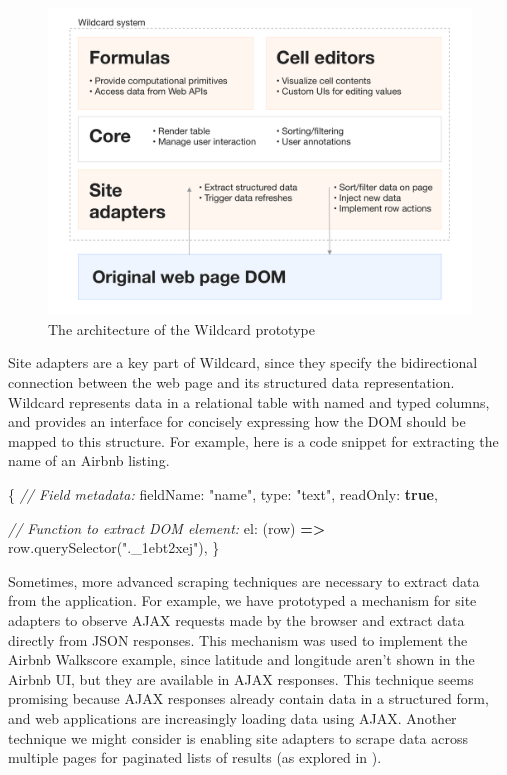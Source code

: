 \documentclass[english,submission]{programming}
\newenvironment{Shaded}{}{}
\newcommand{\CommentTok}[1]{\textcolor[rgb]{0.38,0.63,0.69}{\textit{#1}}}
\newcommand{\FunctionTok}[1]{\textcolor[rgb]{0.02,0.16,0.49}{#1}}
\newcommand{\KeywordTok}[1]{\textcolor[rgb]{0.00,0.44,0.13}{\textbf{#1}}}
\newcommand{\NormalTok}[1]{#1}
\newcommand{\OperatorTok}[1]{\textcolor[rgb]{0.40,0.40,0.40}{#1}}
\newcommand{\StringTok}[1]{\textcolor[rgb]{0.25,0.44,0.63}{#1}}
\newcommand{\VariableTok}[1]{\textcolor[rgb]{0.10,0.09,0.49}{#1}}
\begin{document}
\begin{figure}
\hypertarget{fig:architecture}{%
\centering
\includegraphics{media/architecture-300dpi.png}
\caption{The architecture of the Wildcard
prototype}\label{fig:architecture}
}
\end{figure}

Site adapters are a key part of Wildcard, since they specify the
bidirectional connection between the web page and its structured data
representation. Wildcard represents data in a relational table with
named and typed columns, and provides an interface for concisely
expressing how the DOM should be mapped to this structure. For example,
here is a code snippet for extracting the name of an Airbnb listing.

\begin{Shaded}
\begin{Highlighting}[]
\OperatorTok{\{}
  \CommentTok{// Field metadata:}
\NormalTok{  fieldName}\OperatorTok{:} \StringTok{"name"}\OperatorTok{,}
\NormalTok{  type}\OperatorTok{:} \StringTok{"text"}\OperatorTok{,}
\NormalTok{  readOnly}\OperatorTok{:} \KeywordTok{true}\OperatorTok{,} 
  
  \CommentTok{// Function to extract DOM element:}
\NormalTok{  el}\OperatorTok{:}\NormalTok{ (row) }\KeywordTok{=>} \VariableTok{row}\OperatorTok{.}\FunctionTok{querySelector}\NormalTok{(}\StringTok{".\_1ebt2xej"}\NormalTok{)}\OperatorTok{,}
\OperatorTok{\}}
\end{Highlighting}
\end{Shaded}

Sometimes, more advanced scraping techniques are necessary to extract
data from the application. For example, we have prototyped a mechanism
for site adapters to observe AJAX requests made by the browser and
extract data directly from JSON responses. This mechanism was used to
implement the Airbnb Walkscore example, since latitude and longitude
aren't shown in the Airbnb UI, but they are available in AJAX responses.
This technique seems promising because AJAX responses already contain
data in a structured form, and web applications are increasingly loading
data using AJAX. Another technique we might consider is enabling site
adapters to scrape data across multiple pages for paginated lists of
results (as explored in \autocite{huynh2006}).
\end{document}
